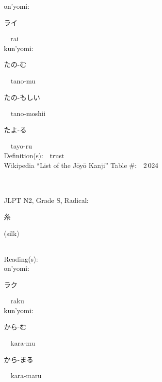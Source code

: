 \begin{multicols}{2}
{\hspace*{1em}}on'yomi:\ \ \\
{\hspace*{2em}}{\begin{CJK}{UTF8}{min} ライ \end{CJK}}\ \ rai\ \ \\
{\hspace*{1em}}kun'yomi:\ \ \\
{\hspace*{2em}}{\begin{CJK}{UTF8}{min} たの-む \end{CJK}}\ \ tano-mu\ \ \\
{\hspace*{2em}}{\begin{CJK}{UTF8}{min} たの-もしい \end{CJK}}\ \ tano-moshii\ \ \\
{\hspace*{2em}}{\begin{CJK}{UTF8}{min} たよ-る \end{CJK}}\ \ tayo-ru\ \ \\
Definition(s):\ \ trust \\
Wikipedia ``List of the J\=oy\=o Kanji'' Table \#:\ \ 2\,024 \\
\ \ \\
{\fontsize{34pt}{40pt}  }\ \ \\  %
{JLPT N2, Grade S, Radical:\ \ {\begin{CJK}{UTF8}{min} 糸 \end{CJK}} (silk) } \\
Reading(s):\ \ \\
{\hspace*{1em}}on'yomi:\ \ \\
{\hspace*{2em}}{\begin{CJK}{UTF8}{min} ラク \end{CJK}}\ \ raku\ \ \\
{\hspace*{1em}}kun'yomi:\ \ \\
{\hspace*{2em}}{\begin{CJK}{UTF8}{min} から-む \end{CJK}}\ \ kara-mu\ \ \\
{\hspace*{2em}}{\begin{CJK}{UTF8}{min} から-まる \end{CJK}}\ \ kara-maru\ \ \\

\end{multicols}
